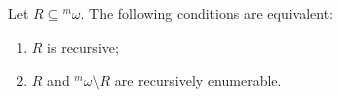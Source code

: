 Let $R \subseteq {}^m \omega$. The following conditions are equivalent:

\begin{enumerate}
\item[(i)] $R$ is recursive;
\item[(ii)] $R$ and ${}^m \omega \setminus R$ are recursively enumerable.
\end{enumerate}
